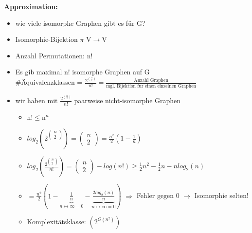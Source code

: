 \newpage
\textbf{Approximation:}
\begin{itemize}
	\item wie viele isomorphe Graphen gibt es für G?
	\item Isomorphie-Bijektion $\pi$ V$\rightarrow$V
	\item Anzahl Permutationen: n!
	\item Es gib maximal n! isomorphe Graphen auf G\\
	
\hspace*{2cm}\#Äquivalenzklassen = $\frac{2^{\binom{n}{2}}}{n!}=\frac{\text{Anzahl Graphen}}{\text{mgl. Bijektion fur einen einzelnen Graphen}}$\\
	\item wir haben mit $\frac{2^{\binom{n}{2}}}{n!}$ paarweise nicht-isomorphe Graphen\\
	\begin{itemize}
		\item n!$\leq$n$^n$
		\item $log_2(2^{\begin{pmatrix}n\\2\end{pmatrix}}) = \begin{pmatrix}n\\2\end{pmatrix} = \frac{n^2}{2}(1-\frac{1}{n})$
		\item $log_2(\frac{2^{\begin{pmatrix}n\\2\end{pmatrix}}}{n!}) = \begin{pmatrix}n\\2\end{pmatrix} - log(n!) \geq \frac{1}{2}n^2-\frac{1}{2}n-n log_2(n)$
		\item $=\frac{n^2}{2}(1-\underbrace{\frac{1}{n}}_{n\mapsto \infty=0}-\underbrace{\frac{2 log_2(n)}{n}}_{n\mapsto \infty=0})$ $\Rightarrow$ Fehler gegen 0 $\rightarrow$ Isomorphie selten!
		\item  Komplexitätsklasse: $(2^{O(n^2)})$
	\end{itemize}
\end{itemize}

